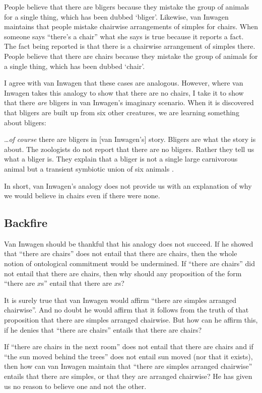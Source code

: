 \documentclass[11pt]{article}
\newenvironment{squote}{%
\begin{spacing}{1}
\begin{list}{}{%
    \setlength{\labelwidth}{0pt}%
    \rightmargin\leftmargin%
  }
\item\relax
}{%
\end{list}%
\end{spacing}
}
\begin{document}
\begin{spacing}{1.5}
People believe that there are bligers because they mistake the group
of animals for a single thing, which has been dubbed `bliger'.
Likewise, van Inwagen maintains that people mistake chairwise
arrangements of simples for chairs.  When someone says ``there's a
chair'' what she says is true because it reports a fact.  The fact
being reported is that there is a chairwise arrangement of simples
there.  People believe that there are chairs because they mistake the
group of animals for a single thing, which has been dubbed `chair'.

I agree with van Inwagen that these cases are analogous.  However,
where van Inwagen takes this analogy to show that there are no chairs,
I take it to show that there {\em are} bligers in van Inwagen's
imaginary scenario.  When it is discovered that bligers are built up
from six other creatures, we are learning something about bligers:

\begin{squote}
\ldots {\em of course} there are bligers in [van Inwagen's] story.
Bligers are what the story is about.  The zoologists do not report
that there are no bligers.  Rather they tell us what a bliger is.
They explain that a bliger is not a single large carnivorous animal
but a transient symbiotic union of six animals
\citep[704]{rosenberg1993}.
\end{squote}

In short, van Inwagen's analogy does not provide us with an
explanation of why we would believe in chairs even if there were none.

\subsection{Backfire}
\label{backfire}
Van Inwagen should be thankful that his analogy does not succeed.  If
he showed that ``there are chairs'' does not entail that there are
chairs, then the whole notion of ontological commitment would be
undermined.  If ``there are chairs'' did not entail that there are
chairs, then why should any proposition of the form ``there are $x$s''
entail that there are $x$s?

It is surely true that van Inwagen would affirm ``there are simples
arranged chairwise''.  And no doubt he would affirm that it follows
from the truth of that proposition that there are simples arranged
chairwise.  But how can he affirm this, if he denies that ``there are
chairs'' entails that there are chairs?

If ``there are chairs in the next room'' does not entail that there
are chairs and if ``the sun moved behind the trees'' does not entail
sun moved (nor that it exists), then how can van Inwagen maintain that
``there are simples arranged chairwise'' entails that there are
simples, or that they are arranged chairwise?  He has given us no
reason to believe one and not the other.


\end{spacing}
\end{document}
